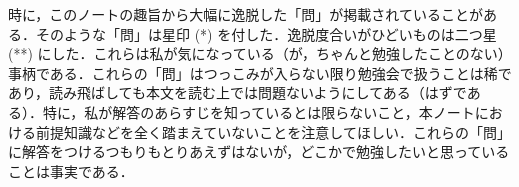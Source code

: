 時に，このノートの趣旨から大幅に逸脱した「問」が掲載されていることがある．そのような「問」は星印 (*) を付した．逸脱度合いがひどいものは二つ星 (**) にした．これらは私が気になっている（が，ちゃんと勉強したことのない）事柄である．これらの「問」はつっこみが入らない限り勉強会で扱うことは稀であり，読み飛ばしても本文を読む上では問題ないようにしてある（はずである）．特に，私が解答のあらすじを知っているとは限らないこと，本ノートにおける前提知識などを全く踏まえていないことを注意してほしい．これらの「問」に解答をつけるつもりもとりあえずはないが，どこかで勉強したいと思っていることは事実である．